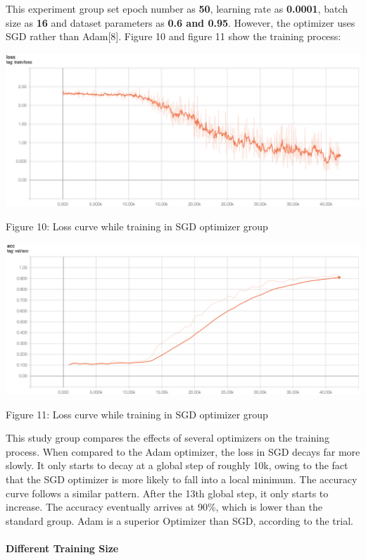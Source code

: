 \documentclass[11pt]{article}
\begin{document}
This experiment group set epoch number as \textbf{50}, learning rate as
\textbf{0.0001}, batch size as \textbf{16} and dataset parameters as
\textbf{0.6 and 0.95}. However, the optimizer uses SGD rather than
Adam{[}8{]}. Figure 10 and figure 11 show the training process:

    \includegraphics{../pics/SGD_1.png}

Figure 10: Loss curve while training in SGD optimizer group

\includegraphics{../pics/SGD_2.png}

Figure 11: Loss curve while training in SGD optimizer group

    This study group compares the effects of several optimizers on the
training process. When compared to the Adam optimizer, the loss in SGD
decays far more slowly. It only starts to decay at a global step of
roughly 10k, owing to the fact that the SGD optimizer is more likely to
fall into a local minimum. The accuracy curve follows a similar pattern.
After the 13th global step, it only starts to increase. The accuracy
eventually arrives at 90\%, which is lower than the standard group. Adam
is a superior Optimizer than SGD, according to the trial.

    \hypertarget{different-training-size}{%
\paragraph{Different Training Size}\label{different-training-size}}
\end{document}
